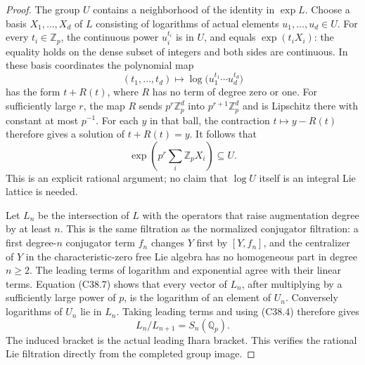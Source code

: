 \begin{proof}
The group \(U\) contains a neighborhood of the identity
in \(\exp L\).  Choose a basis \(X_1,\ldots,X_d\) of \(L\)
consisting of logarithms of actual elements
\(u_1,\ldots,u_d\in U\).
For every \(t_i\in\mathbb Z_p\), the continuous power
\(u_i^{t_i}\) is in \(U\), and equals \(\exp(t_iX_i)\):
the equality holds on the dense subset of integers and
both sides are continuous.
In these basis coordinates the polynomial map
\[
 (t_1,\ldots,t_d)\longmapsto
       \log\bigl(u_1^{t_1}\cdots u_d^{t_d}\bigr)
                                                               \tag{C38.6}
\]
has the form \(t+R(t)\), where \(R\) has no term of
degree zero or one.
For sufficiently large \(r\), the map \(R\) sends
\(p^r\mathbb Z_p^d\) into \(p^{r+1}\mathbb Z_p^d\) and is
Lipschitz there with constant at most \(p^{-1}\).
For each \(y\) in that ball, the contraction
\(t\mapsto y-R(t)\) therefore gives a solution of
\(t+R(t)=y\).
It follows that
\[
       \exp\left(p^r\sum_i\mathbb Z_pX_i\right)\subseteq U .
                                                               \tag{C38.7}
\]
This is an explicit rational argument; no claim that
\(\log U\) itself is an integral Lie lattice is needed.

Let \(L_n\) be the intersection of \(L\) with the
operators that raise augmentation degree by at least \(n\).
This is the same filtration as the normalized conjugator
filtration: a first degree-\(n\) conjugator term \(f_n\)
changes \(Y\) first by \([Y,f_n]\), and the centralizer
of \(Y\) in the characteristic-zero free Lie algebra
has no homogeneous part in degree \(n\geq2\).
The leading terms of logarithm and exponential agree
with their linear terms.
Equation (C38.7) shows that every vector of \(L_n\),
after multiplying by a sufficiently large power of \(p\),
is the logarithm of an element of \(U_n\).
Conversely logarithms of \(U_n\) lie in \(L_n\).
Taking leading terms and using (C38.4) therefore gives
\[
           L_n/L_{n+1}=S_n(\mathbb Q_p).
                                                               \tag{C38.8}
\]
The induced bracket is the actual leading Ihara bracket.
This verifies the rational Lie filtration directly from
the completed group image.


\end{proof}
